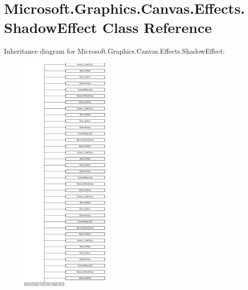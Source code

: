 \hypertarget{class_microsoft_1_1_graphics_1_1_canvas_1_1_effects_1_1_shadow_effect}{}\section{Microsoft.\+Graphics.\+Canvas.\+Effects.\+Shadow\+Effect Class Reference}
\label{class_microsoft_1_1_graphics_1_1_canvas_1_1_effects_1_1_shadow_effect}
Inheritance diagram for Microsoft.\+Graphics.\+Canvas.\+Effects.\+Shadow\+Effect\+:\begin{figure}[H]
\begin{center}
\leavevmode
\includegraphics[height=12.000000cm]{class_microsoft_1_1_graphics_1_1_canvas_1_1_effects_1_1_shadow_effect}
\end{center}
\end{figure}
